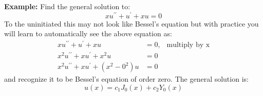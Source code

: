 \vspace{1.0cm}

\noindent\textbf{Example:} Find the general solution to:
\begin{equation*}
xu^{\prime \prime} + u^{\prime} + xu = 0
\end{equation*}
To the uninitiated this may not look like Bessel's equation but with practice you will learn to automatically see the above equation as: 
\begin{align*}
xu^{\prime \prime} + u^{\prime} + xu &= 0, \ \ \text{ multiply by x} \\
x^2u^{\prime \prime} + xu^{\prime} + x^2u &= 0 \\
x^2u^{\prime \prime} + xu^{\prime} + \left(x^2-0^2\right)u &= 0
\end{align*}
and recognize it to be Bessel's equation of order zero.  The general solution is:
\begin{equation*}
u(x) = c_1J_0(x) + c_2Y_0(x)
\end{equation*}
